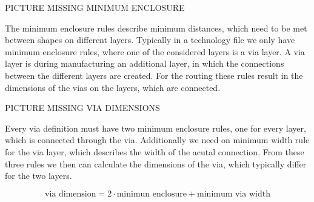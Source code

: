 PICTURE MISSING MINIMUM ENCLOSURE

The minimum enclosure rules describe minimum distances, which need to be met between shapes on different layers. Typically in a technology file we only have minimum enclosure rules, where one of the considered layers is a via layer. A via layer is during manufacturing an additional layer, in which the connections between the different layers are created. For the routing these rules result in the dimensions of the vias on the layers, which are connected.

PICTURE MISSING VIA DIMENSIONS

Every via definition must have two minimum enclosure rules, one for every layer, which is connected through the via. Additionally we need on minimum width rule for the via layer, which describes the width of the acutal connection. From these three rules we then can calculate the dimensions of the via, which typically differ for the two layers.

\[\text{via dimension} = 2 \cdot \text{minimun enclosure} + \text{minimum via width}\]